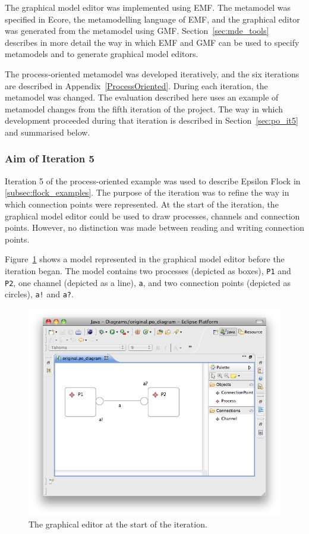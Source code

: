 The graphical model editor was implemented using EMF. The metamodel was specified in Ecore, the metamodelling language of EMF, and the graphical editor was generated from the metamodel using GMF. Section~\ref{sec:mde_tools} describes in more detail the way in which EMF and GMF can be used to specify metamodels and to generate graphical model editors.

The process-oriented metamodel was developed iteratively, and the six iterations are described in Appendix~\ref{ProcessOriented}. During each iteration, the metamodel was changed. The evaluation described here uses an example of metamodel changes from the fifth iteration of the project. The way in which development proceeded during that iteration is described in Section~\ref{sec:po_it5} and summarised below.

\subsubsection{Aim of Iteration 5}
Iteration 5 of the process-oriented example was used to describe Epsilon Flock in \ref{subsec:flock_examples}. The purpose of the iteration was to refine the way in which connection points were represented. At the start of the iteration, the graphical model editor could be used to draw processes, channels and connection points. However, no distinction was made between reading and writing connection points.

Figure~\ref{fig:po_original_editor} shows a model represented in the graphical model editor before the iteration began. The model contains two processes (depicted as boxes), \texttt{P1} and \texttt{P2}, one channel (depicted as a line), \texttt{a}, and two connection points (depicted as circles), \texttt{a!} and \texttt{a?}.

\begin{figure}[htbp]
	\centering
	\includegraphics[width=12.75cm]{6.Evaluation/images/user_driven/po_original_editor.png}
	\caption{The graphical editor at the start of the iteration.}
	\label{fig:po_original_editor}
\end{figure}


